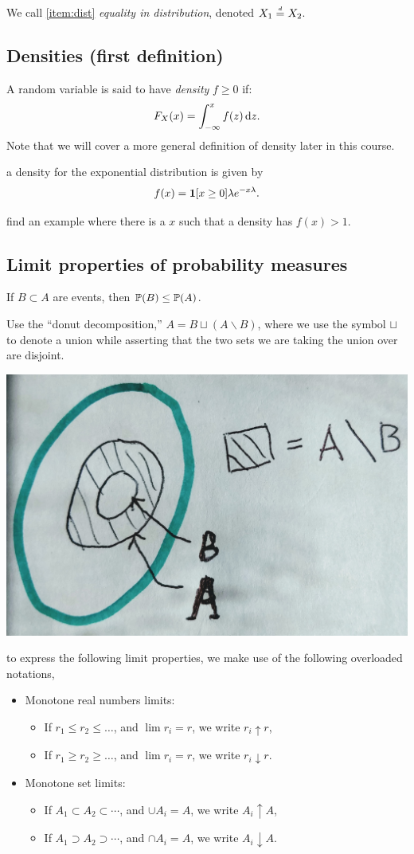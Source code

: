 \documentclass{article}
\begin{document}
 We call \ref{item:dist} \emph{equality in distribution}, denoted $X_1 \deq X_2$. 


\subsection{Densities (first definition)}\label{sec:density-first-def}

A random variable is said to have \emph{density} $f \ge 0$ if: \[ F_X(x) = \int_{-\infty}^x f(z) \ud z. \] Note that we will cover a more general definition of density later in this course.

 a density for the exponential distribution is given by \[ f(x) = \1[x \ge 0] \lambda e^{-x\lambda}. \]

 find an example where there is a $x$ such that a density has $f(x) > 1$.


\subsection{Limit properties of probability measures}\label{sec:limit-pr-measures}

 If $B \subset A$ are events, then $\P(B) \le \P(A)$.

 Use the ``donut decomposition,'' $A = B \sqcup (A \backslash B)$, where we use the symbol $\sqcup$ to denote a union while asserting that the two sets we are taking the union over are disjoint.
\begin{center}
	\includegraphics[width=0.3\linewidth]{figures/donut-1}
\end{center}

 to express the following limit properties, we make use of the following overloaded notations,
\begin{itemize}
  \item Monotone real numbers limits:
  \begin{itemize}
    \item If $r_1 \le r_2 \le \dots$, and $\lim r_i = r$, we write $r_i \uparrow r$,
    \item If $r_1 \ge r_2 \ge \dots$, and $\lim r_i = r$, we write $r_i \downarrow r$.
  \end{itemize}
  \item Monotone set limits:
  \begin{itemize}
    \item If $A_1 \subset A_2 \subset \cdots$, and $\cup A_i = A$, we write $A_i \uparrow A$,
    \item If $A_1 \supset A_2 \supset \cdots$, and $\cap A_i = A$, we write $A_i \downarrow A$.
  \end{itemize}
\end{itemize}
\end{document}
